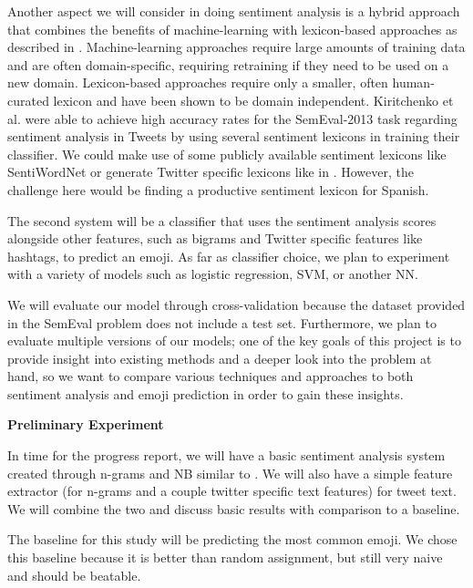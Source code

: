 \documentclass[10pt]{article}
\begin{document}
Another aspect we will consider in doing sentiment analysis is a hybrid approach that combines the benefits of machine-learning with lexicon-based approaches as described in \cite{giachanou2016like}. Machine-learning approaches require large amounts of training data and are often domain-specific, requiring retraining if they need to be used on a new domain. Lexicon-based approaches require only a smaller, often human-curated lexicon and have been shown to be domain independent. Kiritchenko et al. \cite{kiritchenko2014sentiment} were able to achieve high accuracy rates for the SemEval-2013 task regarding sentiment analysis in Tweets by using several sentiment lexicons in training their classifier. We could make use of some publicly available sentiment lexicons like SentiWordNet or generate Twitter specific lexicons like in \cite{kiritchenko2014sentiment}. However, the challenge here would be finding a productive sentiment lexicon for Spanish.

The second system will be a classifier that uses the sentiment analysis scores alongside other features, such as bigrams and Twitter specific features like hashtags, to predict an emoji. As far as classifier choice, we plan to experiment with a variety of models such as logistic regression, SVM, or another NN.

We will evaluate our model through cross-validation because the dataset provided in the SemEval problem does not include a test set. Furthermore, we plan to evaluate multiple versions of our models; one of the key goals of this project is to provide insight into existing methods and a deeper look into the problem at hand, so we want to compare various techniques and approaches to both sentiment analysis and emoji prediction in order to gain these insights.

\textbf{Preliminary Experiment}

In time for the progress report, we will have a basic sentiment analysis system created through n-grams and NB similar to \cite{pak2010twitter}. We will also have a simple feature extractor (for n-grams and a couple twitter specific text features) for tweet text. We will combine the two and discuss basic results with comparison to a baseline.

The baseline for this study will be predicting the most common emoji. We chose this baseline because it is better than random assignment, but still very naive and should be beatable. 
\end{document}
